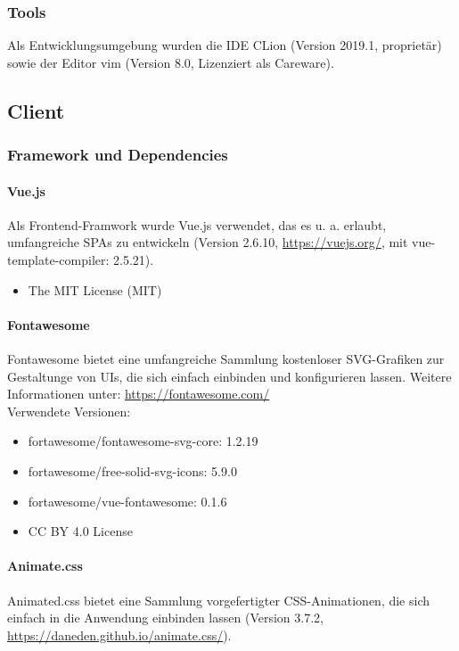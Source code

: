 \subsubsection{Tools}
Als Entwicklungsumgebung wurden die IDE CLion (Version 2019.1, proprietär) sowie der Editor vim (Version 8.0, Lizenziert als Careware).

\subsection{Client}

\subsubsection{Framework und Dependencies}
	\paragraph{Vue.js}
	Als Frontend-Framwork wurde Vue.js verwendet, das es u. a. erlaubt, umfangreiche SPAs zu entwickeln (Version 2.6.10, \url{https://vuejs.org/}, mit vue-template-compiler: 2.5.21).
	
	\begin{itemize}
		\item The MIT License (MIT)
	\end{itemize}
	
	\paragraph{Fontawesome}
	Fontawesome bietet eine umfangreiche Sammlung kostenloser SVG-Grafiken zur Gestaltunge von UIs, die sich einfach einbinden und konfigurieren lassen. Weitere Informationen unter: \url{https://fontawesome.com/}\\
	Verwendete Versionen:
	\begin{itemize}
		\item fortawesome/fontawesome-svg-core: 1.2.19
		\item fortawesome/free-solid-svg-icons: 5.9.0
		\item fortawesome/vue-fontawesome: 0.1.6
		\item CC BY 4.0 License
	\end{itemize}
	
	

	\paragraph{Animate.css}
	Animated.css bietet eine Sammlung vorgefertigter CSS-Animationen, die sich einfach in die Anwendung einbinden lassen (Version 3.7.2, \url{https://daneden.github.io/animate.css/}).
	
